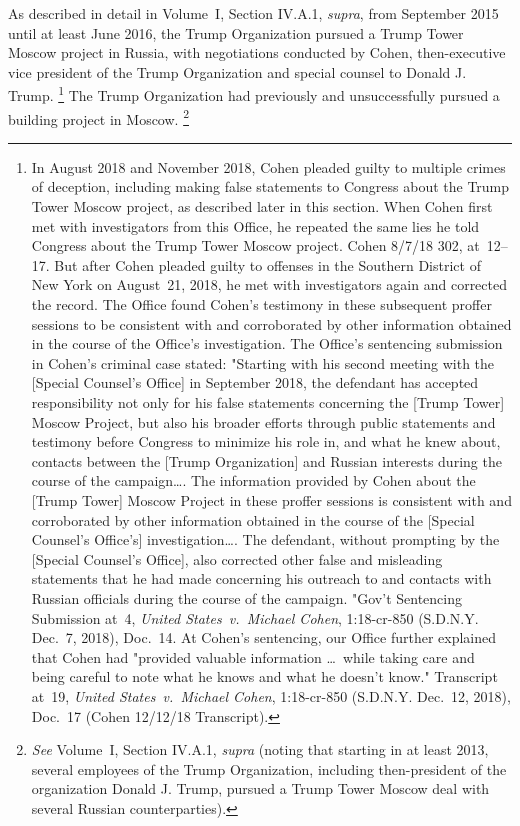 As described in detail in Volume~I, Section IV.A.1, \textit{supra}, from September 2015 until at least June 2016, the Trump Organization pursued a Trump Tower Moscow project in Russia, with negotiations conducted by Cohen, then-executive vice president of the Trump Organization and special counsel to Donald J. Trump.%
\footnote{In August 2018 and November 2018, Cohen pleaded guilty to multiple crimes of deception, including making false statements to Congress about the Trump Tower Moscow project, as described later in this section.
When Cohen first met with investigators from this Office, he repeated the same lies he told Congress about the Trump Tower Moscow project.
Cohen 8/7/18 302, at~12--17.
But after Cohen pleaded guilty to offenses in the Southern District of New York on August~21, 2018, he met with investigators again and corrected the record.
The Office found Cohen's testimony in these subsequent proffer sessions to be consistent with and corroborated by other information obtained in the course of the Office's investigation.
The Office's sentencing submission in Cohen's criminal case stated: "Starting with his second meeting with the [Special Counsel's Office] in September 2018, the defendant has accepted responsibility not only for his false statements concerning the [Trump Tower] Moscow Project, but also his broader efforts through public statements and testimony before Congress to minimize his role in, and what he knew about, contacts between the [Trump Organization] and Russian interests during the course of the campaign\dots.
The information provided by Cohen about the [Trump Tower] Moscow Project in these proffer sessions is consistent with and corroborated by other information obtained in the course of the [Special Counsel's Office's] investigation\dots.
The defendant, without prompting by the [Special Counsel's Office], also corrected other false and misleading statements that he had made concerning his outreach to and contacts with Russian officials during the course of the campaign.
"Gov't Sentencing Submission at~4, \textit{United States~v.\ Michael Cohen}, 1:18-cr-850 (S.D.N.Y. Dec.~7, 2018), Doc.~14.
At Cohen's sentencing, our Office further explained that Cohen had "provided valuable information \dots\ while taking care and being careful to note what he knows and what he doesn't know."
Transcript at~19, \textit{United States~v.\ Michael Cohen}, 1:18-cr-850 (S.D.N.Y. Dec.~12, 2018), Doc.~17 (Cohen 12/12/18 Transcript).}
The Trump Organization had previously and unsuccessfully pursued a building project in Moscow.%
\footnote{\textit{See} Volume~I, Section IV.A.1, \textit{supra} (noting that starting in at least 2013, several employees of the Trump Organization, including then-president of the organization Donald J. Trump, pursued a Trump Tower Moscow deal with several Russian counterparties).}
